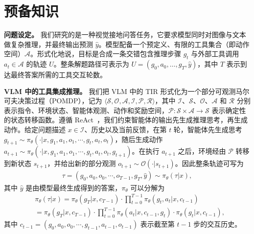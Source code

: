 \section{预备知识}
\label{sec:pre}
\noindent \textbf{问题设定。}
我们研究的是一种视觉接地问答任务，它要求模型同时对图像与文本做复杂推理，并最终输出预测 $\hat{y}$。模型配备一个预定义、有限的工具集合（即动作空间）\(\mathcal{A}\)。形式化地说，目标是合成一条交错包含推理步骤 $g_t$ 与外部工具调用 $a_t \in \mathcal{A}$ 的轨迹 $U$。整条解题路径可表示为 $U=(g_0, a_0, \dots, g_T, \hat{y})$，其中 $T$ 表示到达最终答案所需的工具交互轮数。

\noindent \textbf{VLM 中的工具集成推理。}
我们把 VLM 中的 TIR 形式化为一个部分可观测马尔可夫决策过程（POMDP），记为 $\langle\mathcal{S},\mathcal{O},\mathcal{A},\mathcal{I},\mathcal{P},\mathcal{R}\rangle$，其中 $\mathcal{I}$、$\mathcal{S}$、$\mathcal{O}$、$\mathcal{A}$ 和 $\mathcal{R}$ 分别表示指令、环境状态、智能体观测、动作和奖励空间，$\mathcal{P}: \mathcal{S}\times\mathcal{A}\to\mathcal{S}$ 表示确定性的状态转移函数。遵循 ReAct~\cite{yao2023react}，我们约束智能体的输出先生成推理思考，再生成动作。给定问题描述 $x\in\mathcal{I}$、历史以及当前反馈，在第 $t$ 轮，智能体先生成思考 $g_{t+1}\sim\pi_\theta(\cdot|x,g_1,a_1,o_1,\cdots,g_t,a_t,o_t)$，随后生成动作 $a_{t+1}\sim\pi_\theta(\cdot|x,g_1,a_1,o_1,\cdots,g_t,a_t,o_t,g_{t+1})$。在执行 $a_{t+1}$ 之后，环境经由 $\mathcal{P}$ 转移到新状态 $s_{t+1}$，并给出新的部分观测 $o_{t+1}\sim\mathcal{O}(\cdot|s_{t+1})$。因此整条轨迹可写为
\begin{equation*}
    \begin{aligned}
        \tau=(g_0,a_0,o_0,\cdots,o_{T-1},g_T,\hat{y})\sim\pi_\theta(\tau|x),
    \end{aligned}
\end{equation*}
其中 $\hat{y}$ 是由模型最终生成得到的答案，$\pi_\theta$ 可以分解为
\begin{equation*}
    \begin{aligned}
        &\pi_\theta(\tau|x)=\pi_\theta(g_T|x,c_{T-1})\cdot\prod_{t=0}^{T-1}\pi_\theta(g_t,a_t|x,c_{t-1}) \\
        & =\pi_\theta(g_T|x,c_{T-1})\cdot\prod_{t=0}^{T-1}\pi_\theta(a_t|x,c_{t-1},g_t)\cdot\pi_\theta(g_t|x,c_{t-1}),
    \end{aligned}
\end{equation*}
其中 $c_{t-1}=(g_0,a_0,o_0,\cdots,g_{t-1},a_{t-1},o_{t-1})$ 表示截至第 $t-1$ 步的交互历史。

